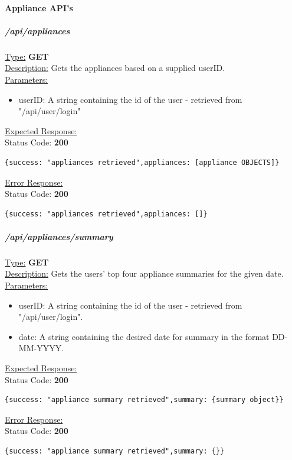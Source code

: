 \documentclass[draft,preprint,12pt,3p]{elsarticle}
\newcommand{\forceindent}{\leavevmode{\parindent=1em\indent}}
\begin{document}
\paragraph{Appliance API's}
\subparagraph*{/api/appliances}
\underline{Type:} \textbf{GET}\\

\underline{Description:} Gets the appliances based on a supplied userID.\\

\underline{Parameters:}
\begin{itemize}
\item userID: A string containing the id of the user - retrieved from "/api/user/login"
\end{itemize}
\underline{Expected Response:}\\[5pt]
\forceindent Status Code: \textbf{200} \\
\begin{verbatim}
{success: "appliances retrieved",appliances: [appliance OBJECTS]}
\end{verbatim}
\underline{Error Response:}\\[5pt]
\forceindent Status Code: \textbf{200} \\
\begin{verbatim}
{success: "appliances retrieved",appliances: []}
\end{verbatim}

\subparagraph*{/api/appliances/summary}
\underline{Type:} \textbf{GET}\\

\underline{Description:} Gets the users' top four appliance summaries for the given date.\\

\underline{Parameters:}
\begin{itemize}
\item userID: A string containing the id of the user - retrieved from "/api/user/login".

\item date: A string containing the desired date for summary in the format DD-MM-YYYY.

\end{itemize}
\underline{Expected Response:}\\[5pt]
\forceindent Status Code: \textbf{200} \\
\begin{verbatim}
{success: "appliance summary retrieved",summary: {summary object}}
\end{verbatim}
\underline{Error Response:}\\[5pt]
\forceindent Status Code: \textbf{200} \\
\begin{verbatim}
{success: "appliance summary retrieved",summary: {}}
\end{verbatim}
\end{document}
